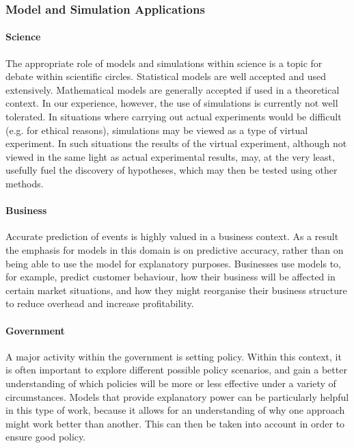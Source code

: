 \subsubsection{Model and Simulation Applications}

\paragraph{Science} The appropriate role of models and simulations within science is a topic for debate within scientific circles. Statistical models are well accepted and used extensively. Mathematical models are generally accepted if used in a theoretical context. In our experience, however, the use of simulations is currently not well tolerated. In situations where carrying out actual experiments would be difficult (e.g. for ethical reasons), simulations may be viewed as a type of virtual experiment. In such situations the results of the virtual experiment, although not viewed in the same light as actual experimental results, may, at the very least, usefully fuel the discovery of hypotheses, which may then be tested using other methods.


\paragraph{Business} Accurate prediction of events is highly valued in a business context. As a result the emphasis for models in this domain is on predictive accuracy, rather than on being able to use the model for explanatory purposes. Businesses use models to, for example, predict customer behaviour, how their business will be affected in certain market situations, and how they might reorganise their business structure to reduce overhead and increase profitability.

\paragraph{Government} A major activity within the government is setting policy. Within this context, it is often important to explore different possible policy scenarios, and gain a better understanding of which policies will be more or less effective under a variety of circumstances. Models that provide explanatory power can be particularly helpful in this type of work, because it allows for an understanding of why one approach might work better than another. This can then be taken into account in order to ensure good policy.

